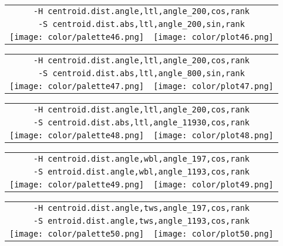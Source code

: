 \documentclass{article}
\begin{document}
\begin{center}
\begin{tabular}{m{8cm}m{8cm}}
\multicolumn{2}{c}{\tt -H centroid.dist.angle,ltl,angle\_200,cos,rank} \\
\multicolumn{2}{c}{\tt -S centroid.dist.abs,ltl,angle\_200,sin,rank} \\
\texttt{[image: color/palette46.png]} &
\texttt{[image: color/plot46.png]}
\end{tabular}
\end{center}

\begin{center}
\begin{tabular}{m{8cm}m{8cm}}
\multicolumn{2}{c}{\tt -H centroid.dist.angle,ltl,angle\_200,cos,rank} \\
\multicolumn{2}{c}{\tt -S centroid.dist.abs,ltl,angle\_800,sin,rank} \\
\texttt{[image: color/palette47.png]} &
\texttt{[image: color/plot47.png]}
\end{tabular}
\end{center}

\begin{center}
\begin{tabular}{m{8cm}m{8cm}}
\multicolumn{2}{c}{\tt -H centroid.dist.angle,ltl,angle\_200,cos,rank} \\
\multicolumn{2}{c}{\tt -S centroid.dist.abs,ltl,angle\_11930,cos,rank} \\
\texttt{[image: color/palette48.png]} &
\texttt{[image: color/plot48.png]}
\end{tabular}
\end{center}

\begin{center}
\begin{tabular}{m{8cm}m{8cm}}
\multicolumn{2}{c}{\tt -H centroid.dist.angle,wbl,angle\_197,cos,rank} \\
\multicolumn{2}{c}{\tt -S entroid.dist.angle,wbl,angle\_1193,cos,rank} \\
\texttt{[image: color/palette49.png]} &
\texttt{[image: color/plot49.png]}
\end{tabular}
\end{center}

\begin{center}
\begin{tabular}{m{8cm}m{8cm}}
\multicolumn{2}{c}{\tt -H centroid.dist.angle,tws,angle\_197,cos,rank} \\
\multicolumn{2}{c}{\tt -S entroid.dist.angle,tws,angle\_1193,cos,rank} \\
\texttt{[image: color/palette50.png]} &
\texttt{[image: color/plot50.png]}
\end{tabular}
\end{center}
\end{document}
